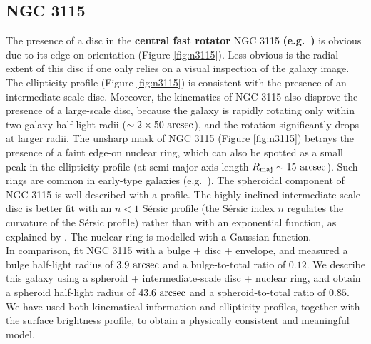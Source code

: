 \documentclass[useAMS,usenatbib,article]{mnras}
\begin{document}
\subsection{NGC 3115}
The presence of a disc in the {\bf central fast rotator} NGC 3115 
{\bf (e.g.~\citealt{strom1977,nieto1988,scorzabender1995}) }
is obvious due to its edge-on orientation (Figure \ref{fig:n3115}). 
Less obvious is the radial extent of this disc if one only relies on a visual inspection of the galaxy image. 
The ellipticity profile (Figure \ref{fig:n3115}) is consistent with the presence of an intermediate-scale disc. 
Moreover, the kinematics of NGC 3115 \citep{arnold2011n3115} also disprove the presence of a large-scale disc, 
because the galaxy is rapidly rotating only within two galaxy half-light radii ($\sim 2 \times 50~\rm arcsec$), 
and the rotation significantly drops at larger radii.  
The unsharp mask of NGC 3115 (Figure \ref{fig:n3115}) betrays the presence of a faint edge-on nuclear ring, 
which can also be spotted as a small peak in the ellipticity profile 
(at semi-major axis length $R_{\rm maj} \sim 15~\rm arcsec$). 
Such rings are common in early-type galaxies (e.g.~\citealt{michardmarchal1993}).
The spheroidal component of NGC 3115 is well described with a \cite{sersic1963} profile.
The highly inclined intermediate-scale disc is better fit with an $n<1$ S\'ersic profile 
(the S\'ersic index $n$ regulates the curvature of the S\'ersic profile) 
rather than with an exponential function, 
as explained by \cite{pastrav2013a}. 
The nuclear ring is modelled with a Gaussian function. \\
In comparison, \cite{lasker2014data} fit NGC 3115 with a bulge + disc + envelope, 
and measured a bulge half-light radius of $3.9~\rm arcsec$ and a bulge-to-total ratio of $0.12$. 
We describe this galaxy using a spheroid + intermediate-scale disc + nuclear ring, 
and obtain a spheroid half-light radius of $43.6~\rm arcsec$ and a spheroid-to-total ratio of $0.85$. 
We have used both kinematical information and ellipticity profiles, 
together with the surface brightness profile, 
to obtain a physically consistent and meaningful model. 
\end{document}
